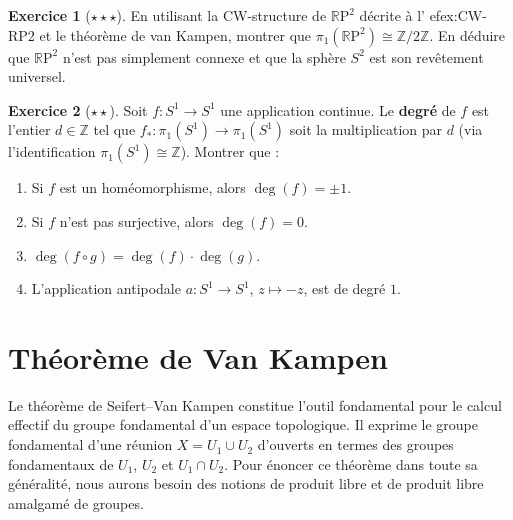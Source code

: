 \documentclass[12pt,a4paper,openany]{book}
\theoremstyle{definition}
\newtheorem{exercice}{Exercice}[chapter]
\theoremstyle{plain}
\theoremstyle{remark}
\newcommand{\Z}{\mathbb{Z}}
\newcommand{\RP}{\mathbb{R}\mathrm{P}}
\begin{document}
\begin{exercice}[$\star\star\star$]\label{exo:pi1-RP2}
En utilisant la CW-structure de $\RP^2$ décrite à l'
ef{ex:CW-RP2} et le
théorème de van Kampen, montrer que $\pi_1(\RP^2) \cong \Z/2\Z$. En déduire
que $\RP^2$ n'est pas simplement connexe et que la sphère $S^2$ est son
revêtement universel.
\end{exercice}

\begin{exercice}[$\star\star$]\label{exo:pi1-application-degree}
Soit $f : S^1 \to S^1$ une application continue. Le \textbf{degré}
de $f$ est l'entier $d \in \Z$ tel que
$f_* : \pi_1(S^1) \to \pi_1(S^1)$ soit la multiplication par $d$ (via
l'identification $\pi_1(S^1) \cong \Z$). Montrer que :
\begin{enumerate}[label=(\alph*)]
\item Si $f$ est un homéomorphisme, alors $\deg(f) = \pm 1$.
\item Si $f$ n'est pas surjective, alors $\deg(f) = 0$.
\item $\deg(f \circ g) = \deg(f) \cdot \deg(g)$.
\item L'application antipodale $a : S^1 \to S^1$, $z \mapsto -z$, est de
degré $1$.
\end{enumerate}
\end{exercice}


\chapter{Théorème de Van Kampen}\label{ch:van-kampen}

\minitoc

\vspace{1em}

Le théorème de Seifert--Van Kampen constitue l'outil fondamental
pour le calcul effectif du groupe fondamental d'un espace topologique. Il exprime le groupe
fondamental d'une réunion $X = U_1 \cup U_2$ d'ouverts en termes des groupes fondamentaux
de $U_1$, $U_2$ et $U_1 \cap U_2$. Pour énoncer ce théorème dans toute sa généralité, nous
aurons besoin des notions de produit libre et de produit libre amalgamé de groupes.
\end{document}
